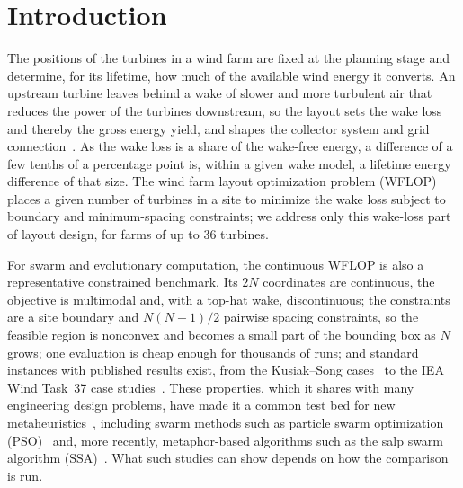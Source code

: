 \section{Introduction}
\label{sec:intro}

The positions of the turbines in a wind farm are fixed at the planning stage and determine, for its lifetime, how much of the available wind energy it converts. An upstream turbine leaves behind a wake of slower and more turbulent air that reduces the power of the turbines downstream, so the layout sets the wake loss and thereby the gross energy yield, and shapes the collector system and grid connection~\cite{Srikakulapu2018,Hou2019}. As the wake loss is a share of the wake-free energy, a difference of a few tenths of a percentage point is, within a given wake model, a lifetime energy difference of that size. The wind farm layout optimization problem (WFLOP) places a given number of turbines in a site to minimize the wake loss subject to boundary and minimum-spacing constraints; we address only this wake-loss part of layout design, for farms of up to 36 turbines.

For swarm and evolutionary computation, the continuous WFLOP is also a representative constrained benchmark. Its $2N$ coordinates are continuous, the objective is multimodal and, with a top-hat wake, discontinuous; the constraints are a site boundary and $N(N-1)/2$ pairwise spacing constraints, so the feasible region is nonconvex and becomes a small part of the bounding box as $N$ grows; one evaluation is cheap enough for thousands of runs; and standard instances with published results exist, from the Kusiak--Song cases~\cite{Kusiak2010} to the IEA Wind Task~37 case studies~\cite{Baker2019}. These properties, which it shares with many engineering design problems, have made it a common test bed for new metaheuristics~\cite{Azlan2021}, including swarm methods such as particle swarm optimization (PSO)~\cite{Pookpunt2013,Asaah2021} and, more recently, metaphor-based algorithms such as the salp swarm algorithm (SSA)~\cite{Mirjalili2017,Rezk2019}. What such studies can show depends on how the comparison is run.


